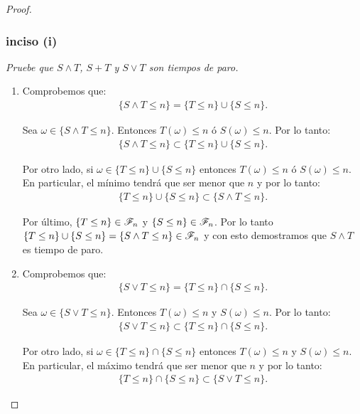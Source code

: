 \begin{proof}
	\subsubsection{inciso (i)} 
	\emph{
		Pruebe que $ S \wedge T $, $ S + T $ y $ S \vee T$ son tiempos de paro.\\
	}
	
		\begin{enumerate}
			\item 
				Comprobemos que:
				\begin{align}
					\{ S \wedge T \leq n \} = \{ T \leq n \} \cup \{ S \leq n\}.
				\end{align}
				
				Sea $\omega \in \{ S \wedge T \leq n \}$. Entonces $T(\omega) \leq n$ ó $S(\omega) \leq n$.
				Por lo tanto:
				\begin{align}
						\{ S \wedge T \leq n \} \subset \{ T \leq n \} \cup \{ S \leq n\}.							
				\end{align}
				
				Por otro lado, si $\omega \in \{ T \leq n \} \cup \{ S \leq n\}$ entonces $T(\omega) \leq n$ ó $S(\omega) \leq n$.
				En particular, el mínimo tendrá que ser menor que $n$ y por lo tanto:
				\begin{align}
						\{ T \leq n \} \cup \{ S \leq n\} \subset \{ S \wedge T \leq n \}.						
				\end{align}
				
				Por último, $\{ T \leq n \} \in \mathscr{F}_n$ y $\{ S \leq n \} \in \mathscr{F}_n$. Por lo tanto	\\	
				$\{ T \leq n \} \cup \{ S \leq n\} = \{ S \wedge T \leq n \} \in \mathscr{F}_n$ y con esto demostramos que 
				$ S \wedge T$ es tiempo de paro.\\
				
			\item
				Comprobemos que:
				\begin{align}
					\{ S \vee T \leq n \} = \{ T \leq n \} \cap \{ S \leq n\}.
				\end{align}
				
				Sea $\omega \in \{ S \vee T \leq n \}$. Entonces $T(\omega) \leq n$ y $S(\omega) \leq n$.
				Por lo tanto:
				\begin{align}
						\{ S \vee T \leq n \} \subset \{ T \leq n \} \cap \{ S \leq n\}.							
				\end{align}
				
				Por otro lado, si $\omega \in \{ T \leq n \} \cap \{ S \leq n\}$ entonces $T(\omega) \leq n$ y $S(\omega) \leq n$.
				En particular, el máximo tendrá que ser menor que $n$ y por lo tanto:
				\begin{align}
						\{ T \leq n \} \cap \{ S \leq n\} \subset \{ S \vee T \leq n \}.						
				\end{align}
				

\end{enumerate}
\end{proof}
